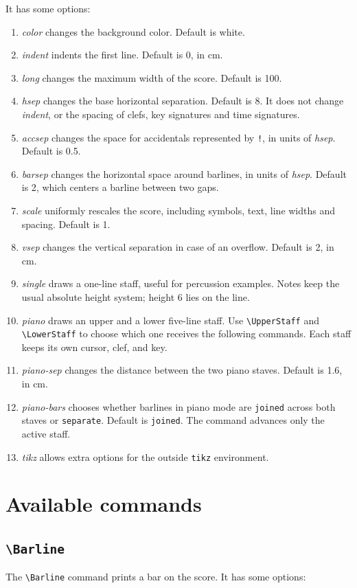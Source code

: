 \documentclass[final]{article}
\begin{document}
It has some options:
	\begin{enumerate}[-]
		\item \textsl{color} changes the background color. Default is white.
		\item \textsl{indent} indents the first line. Default is 0, in cm.
		\item \textsl{long} changes the maximum width of the score. Default is 100.
		\item \textsl{hsep} changes the base horizontal separation. Default is 8. It does not change \textsl{indent}, or the spacing of clefs, key signatures and time signatures.
		\item \textsl{accsep} changes the space for accidentals represented by \texttt{!}, in units of \textsl{hsep}. Default is 0.5.
		\item \textsl{barsep} changes the horizontal space around barlines, in units of \textsl{hsep}. Default is 2, which centers a barline between two gaps. 
		\item \textsl{scale} uniformly rescales the score, including symbols, text, line widths and spacing. Default is 1.
		\item \textsl{vsep} changes the vertical separation in case of an overflow. Default is 2, in cm.
		\item \textsl{single} draws a one-line staff, useful for percussion examples. Notes keep the usual absolute height system; height 6 lies on the line.
		\item \textsl{piano} draws an upper and a lower five-line staff. Use \verb|\UpperStaff| and \verb|\LowerStaff| to choose which one receives the following commands. Each staff keeps its own cursor, clef, and key.
		\item \textsl{piano-sep} changes the distance between the two piano staves. Default is 1.6, in cm.
		\item \textsl{piano-bars} chooses whether barlines in piano mode are \texttt{joined} across both staves or \texttt{separate}. Default is \texttt{joined}. The command advances only the active staff.
		\item \textsl{tikz} allows extra options for the outside \texttt{tikz} environment.
	\end{enumerate}

	\section{Available commands}
	
	\subsection{\texttt{\textbackslash Barline}}
	The \verb|\Barline| command prints a bar on the score. It has some options:
	
\end{document}
